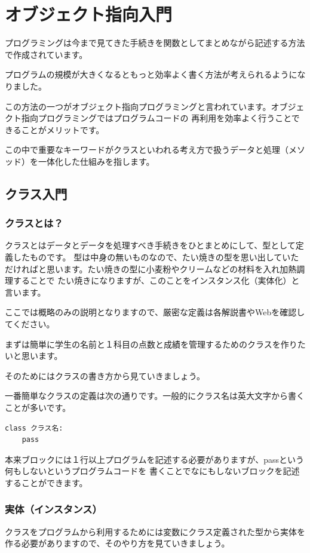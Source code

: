 
\chapter{オブジェクト指向入門}

プログラミングは今まで見てきた手続きを関数としてまとめながら記述する方法で作成されています。

プログラムの規模が大きくなるともっと効率よく書く方法が考えられるようになりました。

この方法の一つがオブジェクト指向プログラミングと言われています。オブジェクト指向プログラミングではプログラムコードの
再利用を効率よく行うことできることがメリットです。

この中で重要なキーワードがクラスといわれる考え方で扱うデータと処理（メソッド）を一体化した仕組みを指します。

\section{クラス入門}
\subsection{クラスとは？}

クラスとはデータとデータを処理すべき手続きをひとまとめにして、型として定義したものです。
型は中身の無いものなので、たい焼きの型を思い出していただければと思います。たい焼きの型に小麦粉やクリームなどの材料を入れ加熱調理することで
たい焼きになりますが、このことをインスタンス化（実体化）と言います。

ここでは概略のみの説明となりますので、厳密な定義は各解説書やWebを確認してください。

まずは簡単に学生の名前と１科目の点数と成績を管理するためのクラスを作りたいと思います。


そのためにはクラスの書き方から見ていきましょう。

一番簡単なクラスの定義は次の通りです。一般的にクラス名は英大文字から書くことが多いです。
\begin{verbatim}
class クラス名:
    pass
\end{verbatim}

本来ブロックには１行以上プログラムを記述する必要がありますが、passという何もしないというプログラムコードを
書くことでなにもしないブロックを記述することができます。

\subsection{実体（インスタンス）}
クラスをプログラムから利用するためには変数にクラス定義された型から実体を作る必要がありますので、そのやり方を見ていきましょう。

